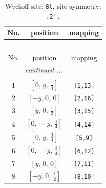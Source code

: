 \documentclass[fleqn,8pt]{jsarticle}
\begin{document}
\begin{longtable}{ccc}
\caption{Wyckoff site: {\tt 8l}, site symmetry: {\tt .2'.}}
 \\
 \hline \hline
No. & position & mapping \\ \hline \endfirsthead

\multicolumn{2}{l}{\tablename\ \thetable{}} \\
 \hline \hline
No. & position & mapping \\ \hline \endhead

 \hline \hline
\multicolumn{2}{r}{\footnotesize\it continued ...} \\ \endfoot

 \hline \hline
\multicolumn{2}{r}{} \\ \endlastfoot

1 & $\left[ 0,\, y,\, \frac{1}{4} \right]$ & {\tt [1,13]} \\ \hline
2 & $\left[ - y,\, 0,\, 0 \right]$ & {\tt [2,16]} \\ \hline
3 & $\left[ y,\, 0,\, \frac{1}{2} \right]$ & {\tt [3,15]} \\ \hline
4 & $\left[ 0,\, - y,\, \frac{1}{4} \right]$ & {\tt [4,14]} \\ \hline
5 & $\left[ 0,\, y,\, \frac{3}{4} \right]$ & {\tt [5,9]} \\ \hline
6 & $\left[ 0,\, - y,\, \frac{3}{4} \right]$ & {\tt [6,12]} \\ \hline
7 & $\left[ y,\, 0,\, 0 \right]$ & {\tt [7,11]} \\ \hline
8 & $\left[ - y,\, 0,\, \frac{1}{2} \right]$ & {\tt [8,10]} \\
\end{longtable}
\renewcommand{\arraystretch}{1.2}
\end{document}
